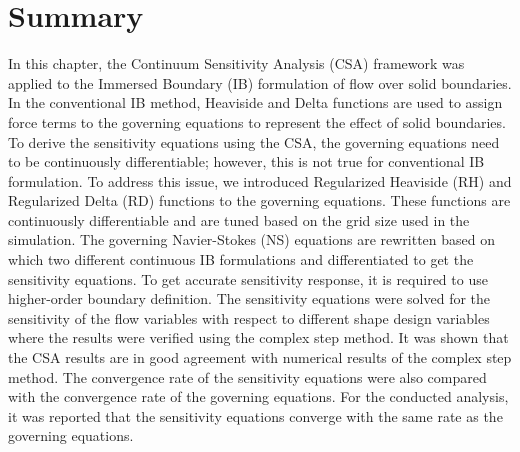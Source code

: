 


\section{Summary}
In this chapter, the Continuum Sensitivity Analysis (CSA) framework was applied to the Immersed Boundary (IB) formulation of flow over solid boundaries. In the conventional IB method, Heaviside and Delta functions are used to assign force terms to the governing equations to represent the effect of solid boundaries. To derive the sensitivity equations using the CSA, the governing equations need to be continuously differentiable; however, this is not true for conventional IB formulation. To address this issue, we introduced Regularized Heaviside (RH) and Regularized Delta (RD) functions to the governing equations. These functions are continuously differentiable and are tuned based on the grid size used in the simulation. The governing Navier-Stokes (NS) equations are rewritten based on which two different continuous IB formulations and differentiated to get the sensitivity equations. To get accurate sensitivity response, it is required to use higher-order boundary definition. The sensitivity equations were solved for the sensitivity of the flow variables with respect to different shape design variables where the results were verified using the complex step method. It was shown that the CSA results are in good agreement with numerical results of the complex step method. The convergence rate of the sensitivity equations were also compared with the convergence rate of the governing equations. For the conducted analysis, it was reported that the sensitivity equations converge with the same rate as the governing equations.